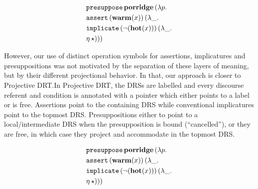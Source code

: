 \begin{minipage}{.4\textwidth}
\end{minipage}
\begin{minipage}{.4\textwidth}
  \vspace*{-4mm}
  \begin{center}
  \begin{align*}
    &\mathtt{presuppose}\,\textbf{porridge}\,(\lambda p.\,  \\
    &\mathtt{assert}\,(\textbf{warm}(x))\,(\lambda \_.\,  \\
    &\mathtt{implicate}\,(\lnot (\textbf{hot}(x)))\,(\lambda \_.\,  \\
    &\eta\,\star)))
  \end{align*}
  \end{center}
\end{minipage}

However, our use of distinct operation symbols for assertions, implicatures
and presuppositions was not motivated by the separation of these layers of
meaning, but by their different projectional behavior. In that, our
approach is closer to Projective DRT.\@ In Projective DRT, the DRSs are
labelled and every discourse referent and condition is annotated with a
pointer which either points to a label or is free. Assertions point to the
containing DRS while conventional implicatures point to the topmost DRS.\@
Presuppositions either to point to a local/intermediate DRS when the
presupposition is bound (``cancelled''), or they are free, in which case
they project and accommodate in the topmost DRS.

\vspace*{3mm}
\begin{minipage}{.4\textwidth}
{
  \begin{center}
  \let \drsalignment = l
  \end{center}
}
\end{minipage}
\begin{minipage}{.4\textwidth}
  \begin{center}
  \begin{align*}
    &\mathtt{presuppose}\,\textbf{porridge}\,(\lambda p.\,  \\
    &\mathtt{assert}\,(\textbf{warm}(x))\,(\lambda \_.\,  \\
    &\mathtt{implicate}\,(\lnot (\textbf{hot}(x)))\,(\lambda \_.\,  \\
    &\eta\,\star)))
  \end{align*}
  \end{center}
\end{minipage}
\vspace{5mm}

